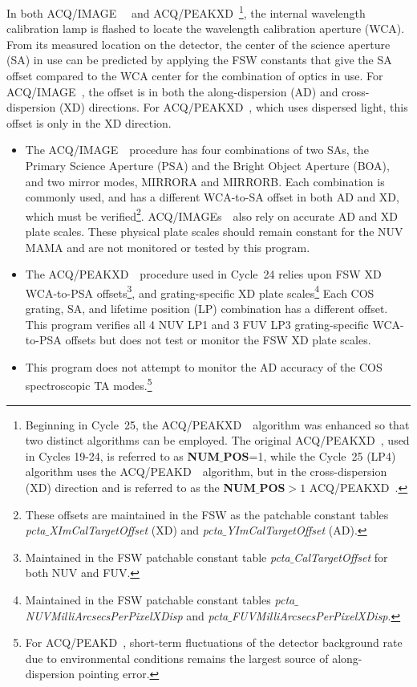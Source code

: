 \documentclass[12pt]{reportj}
\newcommand*{\myfont}{\fontfamily{rm}\selectfont}
\def\numpos{{\bf NUM$\_$POS}\rm}
\def\acqimage{{\myfont ACQ/IMAGE}\rm~}
\def\acqimages{{\myfont ACQ/IMAGE{\rm s}}\rm~}
\def\acqpeakd{{\myfont ACQ/PEAKD}\rm~}
\def\acqpeakxd{{\myfont ACQ/PEAKXD}\rm~}
\begin{document}
In both \acqimage~ and \acqpeakxd\footnote{Beginning in Cycle~25, the \acqpeakxd~algorithm was enhanced so that two distinct algorithms can be employed.
The original \acqpeakxd, used in Cycles 19-24, is referred to as \numpos=1, while the Cycle~25 (LP4) algorithm
uses the \acqpeakd~algorithm, but in the cross-dispersion (XD) direction and is referred to as the \numpos $ > 1$ \acqpeakxd.},
 the internal wavelength calibration lamp is flashed to locate the wavelength calibration aperture (WCA). From its measured location on the detector, the center of the science aperture (SA) in use can be predicted by applying the FSW constants that give the SA offset compared to the WCA center for the combination of optics in use.
For \acqimage, the offset is in both the along-dispersion (AD) and cross-dispersion (XD) directions. For \acqpeakxd, which uses dispersed light, this offset is only in the XD direction.
\begin{itemize}
\item{
The \acqimage~procedure has four combinations of two SAs, the Primary Science Aperture (PSA) and the Bright Object Aperture (BOA), and two mirror modes, MIRRORA and MIRRORB. Each combination is commonly used, and has a different WCA-to-SA offset in both AD and XD, which must be verified\footnote{These offsets are maintained in the FSW as the patchable constant tables {\it pcta$\_$XImCalTargetOffset} (XD) and {\it pcta$\_$YImCalTargetOffset} (AD).}. \acqimages~also rely on accurate AD and XD plate scales. These physical plate scales should remain constant for the NUV MAMA and are not monitored or tested by this program.
}
\item{
The \acqpeakxd~procedure used in Cycle~24 relies upon FSW XD WCA-to-PSA offsets\footnote{Maintained in the FSW patchable constant table {\it pcta$\_$CalTargetOffset} for both NUV and FUV.}, and grating-specific XD plate scales\footnote{Maintained in the FSW patchable constant tables {\it pcta$\_$NUVMilliArcsecsPerPixelXDisp} and {\it pcta$\_$FUVMilliArcsecsPerPixelXDisp}.}
Each COS grating, SA, and lifetime position (LP) combination has a different offset. This program verifies all 4 NUV LP1 and 3 FUV LP3 grating-specific WCA-to-PSA offsets but does not test or monitor the FSW XD plate scales.
}
\item{
This program does not attempt to monitor the AD accuracy of the COS spectroscopic TA modes.\footnote{For \acqpeakd, short-term fluctuations of the detector background rate due to environmental conditions remains the largest source of along-dispersion pointing error.}
}
\end{itemize}
\end{document}
